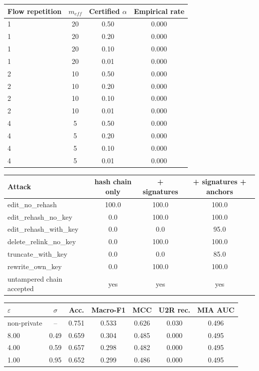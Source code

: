 \begin{tabular}{lccc}
\toprule
Flow repetition & $m_{eff}$ & Certified $\alpha$ & Empirical rate \\
\midrule
1 & 20 & 0.50 & 0.000 \\
1 & 20 & 0.20 & 0.000 \\
1 & 20 & 0.10 & 0.000 \\
1 & 20 & 0.01 & 0.000 \\
2 & 10 & 0.50 & 0.000 \\
2 & 10 & 0.20 & 0.000 \\
2 & 10 & 0.10 & 0.000 \\
2 & 10 & 0.01 & 0.000 \\
4 & 5 & 0.50 & 0.000 \\
4 & 5 & 0.20 & 0.000 \\
4 & 5 & 0.10 & 0.000 \\
4 & 5 & 0.01 & 0.000 \\
\bottomrule
\end{tabular}

\begin{tabular}{lccc}
\toprule
Attack & hash chain only & + signatures & + signatures + anchors \\
\midrule
edit\_no\_rehash & 100.0 & 100.0 & 100.0 \\
edit\_rehash\_no\_key & 0.0 & 100.0 & 100.0 \\
edit\_rehash\_with\_key & 0.0 & 0.0 & 95.0 \\
delete\_relink\_no\_key & 0.0 & 100.0 & 100.0 \\
truncate\_with\_key & 0.0 & 0.0 & 85.0 \\
rewrite\_own\_key & 0.0 & 100.0 & 100.0 \\
untampered chain accepted & yes & yes & yes \\
\bottomrule
\end{tabular}

\begin{tabular}{lcccccc}
\toprule
$\varepsilon$ & $\sigma$ & Acc. & Macro-F1 & MCC & U2R rec. & MIA AUC \\
\midrule
non-private & -- & 0.751 & 0.533 & 0.626 & 0.030 & 0.496 \\
8.00 & 0.49 & 0.659 & 0.304 & 0.485 & 0.000 & 0.495 \\
4.00 & 0.59 & 0.657 & 0.298 & 0.482 & 0.000 & 0.495 \\
1.00 & 0.95 & 0.652 & 0.299 & 0.486 & 0.000 & 0.495 \\
\bottomrule
\end{tabular}
